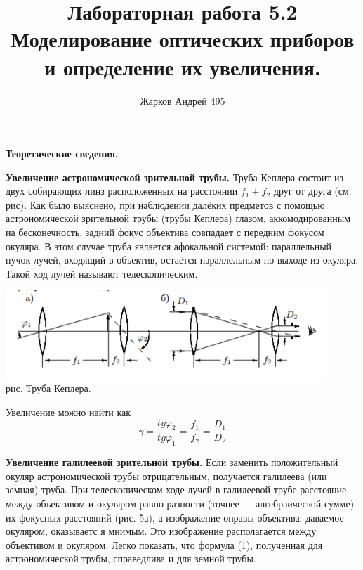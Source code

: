 \documentclass[12pt]{article}
\begin{document}
	\author {Жарков Андрей 495}
	\title {Лабораторная работа 5.2 \\  Моделирование оптических приборов и определение их увеличения.}
    \maketitle{}
	    
    \begin{center}
    	\textbf{\large Теоретические сведения.}
    \end{center}
    
    \textbf{Увеличение астрономической зрительной трубы.} Труба Кеплера состоит из двух собирающих линз расположенных на расстоянии $f_1 + f_2$ друг от друга (см. рис). Как было выяснено, при наблюдении далёких предметов с помощью астрономической
    зрительной трубы (трубы Кеплера) глазом, аккомодированным на бесконечность, задний фокус объектива совпадает с передним фокусом окуляра.
    В этом случае труба является афокальной системой: параллельный
    пучок лучей, входящий в объектив, остаётся параллельным по выходе
    из окуляра.
    Такой ход лучей называют телескопическим.
    
    \begin{center}
    	\includegraphics[width=12cm]{theory1.png}\\
    	рис. Труба Кеплера.
    \end{center}
    
    Увеличение можно найти как 
    \begin{equation}
	    \gamma = \frac{tg \varphi_2}{tg \varphi_1} = \frac{f_1}{f_2} = \frac{D_1}{D_2}
    \end{equation}
    
    \textbf{Увеличение галилеевой зрительной трубы.} Если заменить положительный окуляр астрономической трубы отрицательным, получается
    галилеева (или земная) труба. При телескопическом ходе лучей в галилеевой трубе расстояние между объективом и окуляром равно разности
    (точнее — алгебраической сумме) их фокусных расстояний (рис. 5а),
    а изображение оправы объектива, даваемое окуляром, оказываетс
    я мнимым. Это изображение располагается между объективом и окуляром.
    Легко показать, что формула (1), полученная для астрономической трубы, справедлива и для земной трубы.
    
\end{document}
